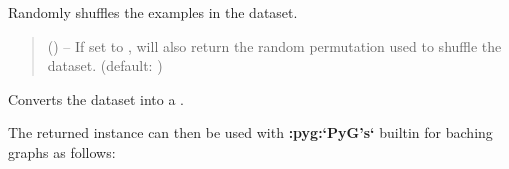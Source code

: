 \documentclass[letterpaper,10pt,english]{sphinxhowto}
\begin{document}
\begin{fulllineitems}
\begin{fulllineitems}
\end{fulllineitems}


\begin{fulllineitems}
\label{\detokenize{datasets:datasets.EgoDataset.shuffle}}
\pysigstartsignatures
{}
\pysigstopsignatures
\sphinxAtStartPar
Randomly shuffles the examples in the dataset.
\begin{quote}\begin{description}
\sphinxAtStartPar
{} (\sphinxstyleliteralemphasis{\sphinxupquote{, }}) – If set to , will also
return the random permutation used to shuffle the dataset.
(default: )

\sphinxAtStartPar
{}

\end{description}\end{quote}

\end{fulllineitems}


\begin{fulllineitems}
\label{\detokenize{datasets:datasets.EgoDataset.to_datapipe}}
\pysigstartsignatures
{}
\pysigstopsignatures
\sphinxAtStartPar
Converts the dataset into a .

\sphinxAtStartPar
The returned instance can then be used with {\color{red}\bfseries{}:pyg:`PyG's`} built\sphinxhyphen{}in
 for baching graphs as follows:

\begin{sphinxVerbatim}[commandchars=\\\{\}]
   


\end{sphinxVerbatim}
\end{fulllineitems}
\end{fulllineitems}
\end{document}
